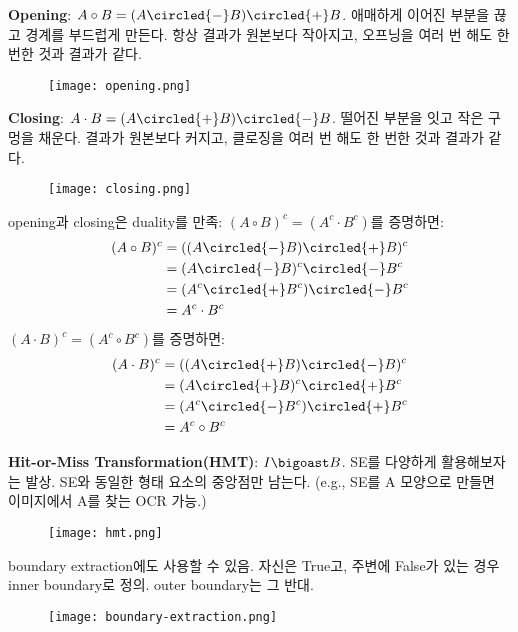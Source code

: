 \textbf{Opening}: $A \circ B = (A \circled{-} B) \circled{+} B$. 애매하게 이어진 부분을 끊고 경계를 부드럽게 만든다. 항상 결과가 원본보다 작아지고, 오프닝을 여러 번 해도 한 번한 것과 결과가 같다.

\begin{figure}[h]
  \centering
  \texttt{[image: opening.png]}
\end{figure}

\textbf{Closing}: $A \cdot B = (A \circled{+} B) \circled{-} B$. 떨어진 부분을 잇고 작은 구멍을 채운다. 결과가 원본보다 커지고, 클로징을 여러 번 해도 한 번한 것과 결과가 같다.

\begin{figure}[h]
  \centering
  \texttt{[image: closing.png]}
\end{figure}

opening과 closing은 duality를 만족: $(A \circ B)^c = (A^c \cdot B^c)$를 증명하면:
$$
\begin{aligned}
(A \circ B)^c &= ((A \circled{-} B) \circled{+} B)^c \\
&= (A \circled{-} B)^c \circled{-} B^c \\
&= (A^c \circled{+} B^c) \circled{-} B^c \\
&= A^c \cdot B^c
\end{aligned}
$$
$(A \cdot B)^c = (A^c \circ B^c)$를 증명하면:
$$
\begin{aligned}
(A \cdot B)^c &= ((A \circled{+} B) \circled{-} B)^c \\
&= (A \circled{+} B)^c \circled{+} B^c \\
&= (A^c \circled{-} B^c) \circled{+} B^c \\
&= A^c \circ B^c
\end{aligned}
$$

\textbf{Hit-or-Miss Transformation(HMT)}: $I \bigoast B$. SE를 다양하게 활용해보자는 발상. SE와 동일한 형태 요소의 중앙점만 남는다. (e.g., SE를 A 모양으로 만들면 이미지에서 A를 찾는 OCR 가능.)

\begin{figure}[h]
  \centering
  \texttt{[image: hmt.png]}
\end{figure}

boundary extraction에도 사용할 수 있음. 자신은 True고, 주변에 False가 있는 경우 inner boundary로 정의. outer boundary는 그 반대.

\begin{figure}[h]
  \centering
  \texttt{[image: boundary-extraction.png]}
\end{figure}

